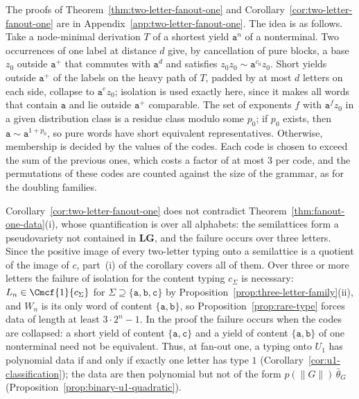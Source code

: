 The proofs of Theorem~\ref{thm:two-letter-fanout-one} and
Corollary~\ref{cor:two-letter-fanout-one} are in
Appendix~\ref{app:two-letter-fanout-one}.  The idea is as follows.  Take a
node-minimal derivation $T$ of a shortest yield $\mathtt a^n$ of a nonterminal.
Two occurrences of one label at distance $d$ give, by cancellation of pure
blocks, a base $z_0$ outside $\mathtt a^+$ that commutes with $\mathtt a^d$ and
satisfies $z_0z_0\sim\mathtt a^{c_0}z_0$.  Short yields outside $\mathtt a^+$ of the
labels on the heavy path of $T$, padded by at most $d$ letters on each side,
collapse to $\mathtt a^ez_0$; isolation is used exactly here, since it makes all
words that contain $\mathtt a$ and lie outside $\mathtt a^+$ comparable.  The
set of exponents $f$ with $\mathtt a^fz_0$ in a given distribution class is a
residue class modulo some $p_0$; if $p_0$ exists, then $\mathtt a\sim\mathtt
a^{1+p_0}$, so pure words have short equivalent representatives.  Otherwise,
membership is decided by the values of the codes.  Each code is chosen to exceed
the sum of the previous ones, which costs a factor of at most $3$ per code, and
the permutations of these codes are counted against the size of the grammar,
as for the doubling families.

Corollary~\ref{cor:two-letter-fanout-one} does not contradict
Theorem~\ref{thm:fanout-one-data}(i), whose quantification is over all
alphabets: the semilattices form a pseudovariety not contained in
$\mathbf{LG}$, and the failure occurs over three letters.  Since the positive
image of every two-letter typing onto a semilattice is a quotient of the image
of $c$, part~(i) of the corollary covers all of them.  Over three or more
letters the failure of isolation for the content typing $c_\Sigma$ is
necessary: $L_n\in\Cmcf{1}{c_\Sigma}$ for $\Sigma\supseteq\{\mathtt a,\mathtt b,\mathtt
c\}$ by Proposition~\ref{prop:three-letter-family}(ii), and $W_n$ is its only word
of content $\{\mathtt a,\mathtt b\}$, so Proposition~\ref{prop:rare-type} forces data
of length at least $3\cdot2^n-1$.  In the proof the failure occurs when the codes
are collapsed: a short yield of content $\{\mathtt a,\mathtt c\}$ and a yield of
content $\{\mathtt a,\mathtt b\}$ of one nonterminal need not be equivalent.
Thus, at fan-out one, a typing onto $U_1$ has polynomial data if and only if
exactly one letter has type $1$ (Corollary~\ref{cor:u1-classification}); the data
are then polynomial but not of the form $p(\|G\|)\,\bar\theta_G$
(Proposition~\ref{prop:binary-u1-quadratic}).


